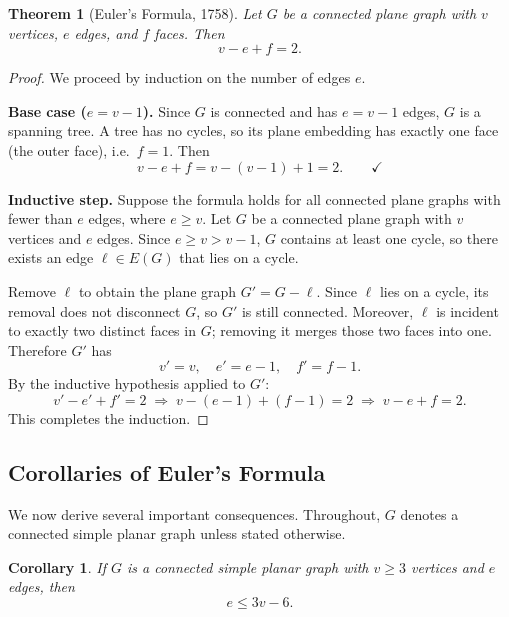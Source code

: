 \documentclass[12pt,a4paper]{article}
\theoremstyle{definition}
\theoremstyle{plain}
\newtheorem{theorem}{Theorem}[section]
\newtheorem{corollary}{Corollary}[section]
\theoremstyle{remark}
\begin{document}
\begin{theorem}[Euler's Formula, 1758]\label{thm:euler}
  Let $G$ be a connected plane graph with $v$ vertices, $e$ edges, and $f$
  faces.  Then
  \[
    v - e + f = 2.
  \]
\end{theorem}

\begin{proof}
  We proceed by induction on the number of edges $e$.

  \medskip\noindent
  \textbf{Base case ($e = v-1$).}  Since $G$ is connected and has $e=v-1$
  edges, $G$ is a spanning tree.  A tree has no cycles, so its plane embedding
  has exactly one face (the outer face), i.e.\ $f=1$.  Then
  \[
    v - e + f = v - (v-1) + 1 = 2. \qquad\checkmark
  \]

  \medskip\noindent
  \textbf{Inductive step.}  Suppose the formula holds for all connected plane
  graphs with fewer than $e$ edges, where $e \geq v$.  Let $G$ be a connected
  plane graph with $v$ vertices and $e$ edges.  Since $e \geq v > v-1$, $G$
  contains at least one cycle, so there exists an edge $\ell \in E(G)$ that lies
  on a cycle.

  Remove $\ell$ to obtain the plane graph $G' = G - \ell$.  Since $\ell$ lies on
  a cycle, its removal does not disconnect $G$, so $G'$ is still connected.
  Moreover, $\ell$ is incident to exactly two distinct faces in $G$; removing it
  merges those two faces into one.  Therefore $G'$ has
  \[
    v' = v, \quad e' = e-1, \quad f' = f-1.
  \]
  By the inductive hypothesis applied to $G'$:
  \[
    v' - e' + f' = 2
    \;\Longrightarrow\;
    v - (e-1) + (f-1) = 2
    \;\Longrightarrow\;
    v - e + f = 2.
  \]
  This completes the induction.
\end{proof}

\subsection{Corollaries of Euler's Formula}

We now derive several important consequences.  Throughout, $G$ denotes a
connected simple planar graph unless stated otherwise.

\begin{corollary}\label{cor:3v6}
  If $G$ is a connected simple planar graph with $v \geq 3$ vertices and $e$
  edges, then
  \[
    e \leq 3v - 6.
  \]
\end{corollary}
\end{document}

